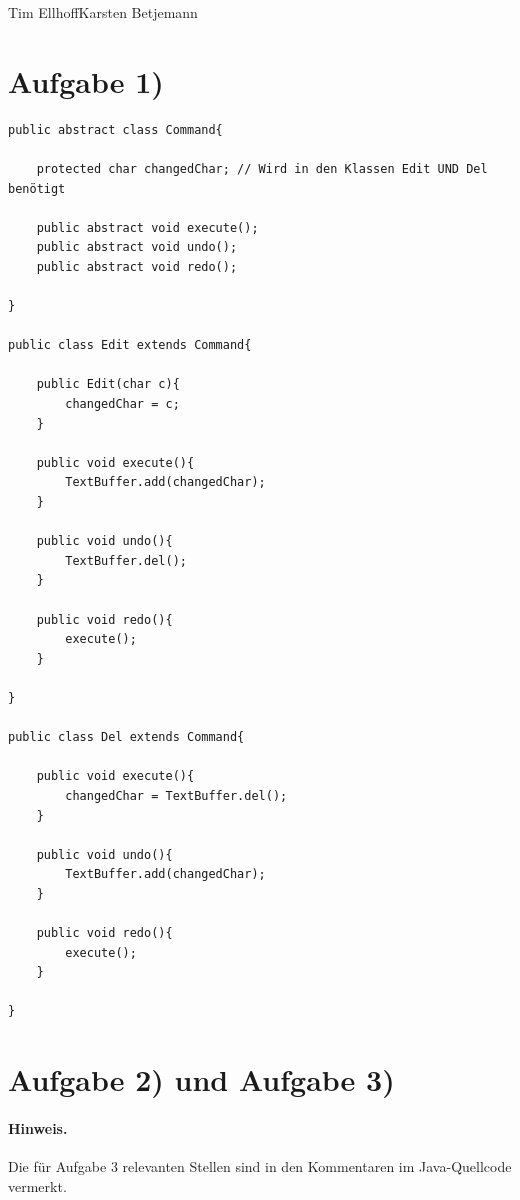 \documentclass{swp1}
\begin{document}
          {Tim Ellhoff}{Karsten Betjemann}{}
          
\section*{Aufgabe 1)}

\begin{lstlisting}
public abstract class Command{
	
	protected char changedChar; // Wird in den Klassen Edit UND Del benötigt
	
	public abstract void execute();
	public abstract void undo();
	public abstract void redo();

}

public class Edit extends Command{
	
	public Edit(char c){
		changedChar = c;
	}
	
	public void execute(){
		TextBuffer.add(changedChar);
	}
	
	public void undo(){
		TextBuffer.del();
	}
	
	public void redo(){
		execute();
	}

}

public class Del extends Command{
	
	public void execute(){
		changedChar = TextBuffer.del();
	}
	
	public void undo(){
		TextBuffer.add(changedChar);
	}
	
	public void redo(){
		execute();
	}

}
\end{lstlisting}


\section*{Aufgabe 2) und Aufgabe 3)}
\paragraph{Hinweis.} Die für Aufgabe 3 relevanten Stellen sind in den Kommentaren im Java-Quellcode vermerkt.
\end{document}
